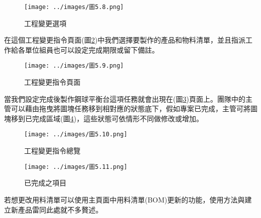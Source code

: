 \begin{figure}[h!]
\centering
\texttt{[image: ../images/圖5.8.png]}
\caption{工程變更選項}\label{工程變更選項}
\end{figure}

在這個工程變更指令頁面(圖\ref{工程變更指令頁面})中我們選擇要製作的產品和物料清單，並且指派工作給各單位組員也可以設定完成期限或留下備註。\\

\begin{figure}[h!]
\centering
\texttt{[image: ../images/圖5.9.png]}
\caption{工程變更指令頁面}\label{工程變更指令頁面}
\end{figure}

當我們設定完成後製作鋼球平衡台這項任務就會出現在(圖\ref{工程變更指令總覽})頁面上。團隊中的主管可以藉由拖曳將圖塊任務移到相對應的狀態底下，假如專案已完成，主管可將圖塊移到已完成區域(圖\ref{已完成之項目})，這些狀態可依情形不同做修改或增加。\\


\begin{figure}[h!]
\centering
\texttt{[image: ../images/圖5.10.png]}
\caption{工程變更指令總覽}\label{工程變更指令總覽}
\end{figure}

\begin{figure}[h!]
\centering
\texttt{[image: ../images/圖5.11.png]}
\caption{已完成之項目}\label{已完成之項目}
\end{figure}

若想更改用料清單可以使用主頁面中用料清單(BOM)更新的功能，使用方法與建立新產品雷同此處就不多贅述。

\newpage
